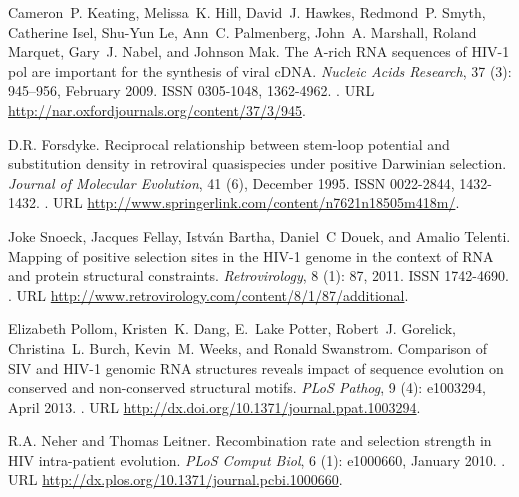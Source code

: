 \documentclass[11pt]{article}
\begin{document}
\begin{thebibliography}{48}
Cameron~P. Keating, Melissa~K. Hill, David~J. Hawkes, Redmond~P. Smyth,
  Catherine Isel, Shu-Yun Le, Ann~C. Palmenberg, John~A. Marshall, Roland
  Marquet, Gary~J. Nabel, and Johnson Mak.
\newblock The {A-rich} {RNA} sequences of {HIV-1} pol are important for the
  synthesis of viral {cDNA}.
\newblock \emph{Nucleic Acids Research}, 37 (3): 945--956,
  February 2009.
\newblock ISSN 0305-1048, 1362-4962.
\newblock {}.
\newblock URL \url{http://nar.oxfordjournals.org/content/37/3/945}.

{D.R.} Forsdyke.
\newblock Reciprocal relationship between stem-loop potential and substitution
  density in retroviral quasispecies under positive {Darwinian} selection.
\newblock \emph{Journal of Molecular Evolution}, 41 (6), December
  1995.
\newblock ISSN 0022-2844, 1432-1432.
\newblock {}.
\newblock URL \url{http://www.springerlink.com/content/n7621n18505m418m/}.

Joke Snoeck, Jacques Fellay, István Bartha, Daniel~C Douek, and Amalio
  Telenti.
\newblock Mapping of positive selection sites in the {HIV-1} genome in the
  context of {RNA} and protein structural constraints.
\newblock \emph{Retrovirology}, 8 (1): 87, 2011.
\newblock ISSN 1742-4690.
\newblock {}.
\newblock URL \url{http://www.retrovirology.com/content/8/1/87/additional}.

Elizabeth Pollom, Kristen~K. Dang, E.~Lake Potter, Robert~J. Gorelick,
  Christina~L. Burch, Kevin~M. Weeks, and Ronald Swanstrom.
\newblock Comparison of {SIV} and {HIV-1} genomic {RNA} structures reveals
  impact of sequence evolution on conserved and non-conserved structural
  motifs.
\newblock \emph{{PLoS} Pathog}, 9 (4): e1003294, April 2013.
\newblock {}.
\newblock URL \url{http://dx.doi.org/10.1371/journal.ppat.1003294}.

{R.A.} Neher and Thomas Leitner.
\newblock Recombination rate and selection strength in {HIV} intra-patient
  evolution.
\newblock \emph{{PLoS} Comput Biol}, 6 (1): e1000660, January
  2010.
\newblock {}.
\newblock URL \url{http://dx.plos.org/10.1371/journal.pcbi.1000660}.


\end{thebibliography}
\end{document}
